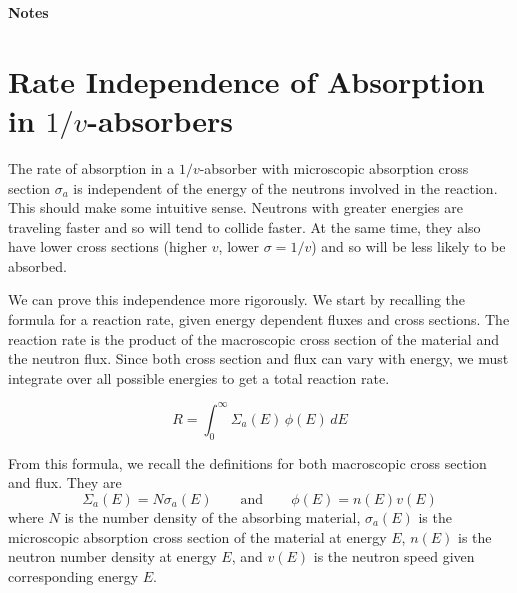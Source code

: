 \documentclass{report}
\begin{document}
\thispagestyle{FirstPage}
\begin{center}
\textbf{\large Notes}
\end{center}


\section*{Rate Independence of Absorption in $1/v$-absorbers} 

The rate of absorption in a $1/v$-absorber with microscopic absorption cross section $\sigma_a$ is independent of the energy of the neutrons involved in the reaction. This should make some intuitive sense. Neutrons with greater energies are traveling faster and so will tend to collide faster. At the same time, they also have lower cross sections (higher $v$, lower $\sigma = 1/v$) and so will be less likely to be absorbed. 

We can prove this independence more rigorously. We start by recalling the formula for a reaction rate, given energy dependent fluxes and cross sections. The reaction rate is the product of the macroscopic cross section of the material and the neutron flux. Since both cross section and flux can vary with energy, we must integrate over all possible energies to get a total reaction rate.

\begin{equation}
\label{reactionrate}
R = \int_0^{\infty} \Sigma_a(E) \, \phi(E) \, dE
\end{equation}

From this formula, we recall the definitions for both macroscopic cross section and flux. They are
$$ \Sigma_a(E) = N \sigma_a(E) \qquad\text{and}\qquad \phi(E) = n(E) v(E) $$
where $N$ is the number density of the absorbing material, $\sigma_a(E)$ is the microscopic absorption cross section of the material at energy $E$, $n(E)$ is the neutron number density at energy $E$, and $v(E)$ is the neutron speed given corresponding energy $E$. 
\end{document}

